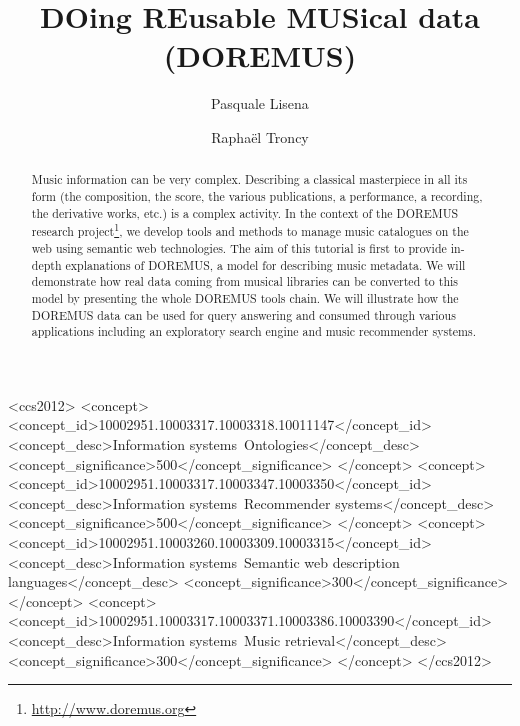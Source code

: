 \documentclass[sigconf]{acmart}
\begin{document}
\title{{DO}ing {RE}usable {MUS}ical data ({DOREMUS})}

\author{Pasquale Lisena}

\author{Rapha\"el Troncy}

\renewcommand{\shortauthors}{P. Lisena et R. Troncy}


\begin{abstract}
Music information can be very complex. Describing a classical masterpiece in all its form (the composition, the score, the various publications, a performance, a recording, the derivative works, etc.) is a complex activity. In the context of the DOREMUS research project\footnote{\url{http://www.doremus.org}}, we develop tools and methods to manage music catalogues on the web using semantic web technologies.
The aim of this tutorial is first to provide in-depth explanations of DOREMUS, a model for describing music metadata. We will demonstrate how real data coming from musical libraries can be converted to this model by presenting the whole DOREMUS tools chain.
We will illustrate how the DOREMUS data can be used for query answering and consumed through various applications including an exploratory search engine and music recommender systems.
\end{abstract}

%
%
\begin{CCSXML}
<ccs2012>
<concept>
<concept_id>10002951.10003317.10003318.10011147</concept_id>
<concept_desc>Information systems~Ontologies</concept_desc>
<concept_significance>500</concept_significance>
</concept>
<concept>
<concept_id>10002951.10003317.10003347.10003350</concept_id>
<concept_desc>Information systems~Recommender systems</concept_desc>
<concept_significance>500</concept_significance>
</concept>
<concept>
<concept_id>10002951.10003260.10003309.10003315</concept_id>
<concept_desc>Information systems~Semantic web description languages</concept_desc>
<concept_significance>300</concept_significance>
</concept>
<concept>
<concept_id>10002951.10003317.10003371.10003386.10003390</concept_id>
<concept_desc>Information systems~Music retrieval</concept_desc>
<concept_significance>300</concept_significance>
</concept>
</ccs2012>
\end{CCSXML}
\end{document}

